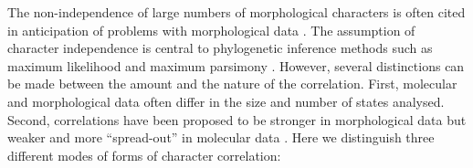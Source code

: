 \documentclass[12pt,letterpaper]{article}
\begin{document}
The non-independence of large numbers of morphological characters is often cited in anticipation of problems with morphological data \cite[e.g.][]{Davalos01072014, ZouConvergence}.
The assumption of character independence is central to phylogenetic inference methods such as maximum likelihood and maximum parsimony \citep[e.g.][]{joysey1982problems,felsenstein1985phylogenies,lewisa2001,felsenstein2004inferring}.
However, several distinctions can be made between the amount and the nature of the correlation.
First, molecular and morphological data often differ in the size and number of states analysed.
Second, correlations have been proposed to be stronger in morphological data
but weaker and more ``spread-out'' in molecular data \citep[][]{huelsenbeck1999effect}. %
Here we distinguish three different modes of forms of character correlation:
\end{document}
